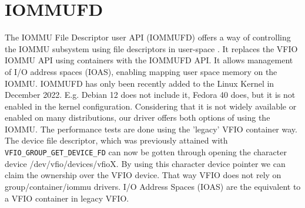 \section{IOMMUFD}
The IOMMU File Descriptor user API (IOMMUFD) offers a way of controlling the IOMMU subsystem using file descriptors in user-space \cite{iommufdkerneldocs}. It replaces the VFIO IOMMU API using containers with the IOMMUFD API.
It allows management of I/O address spaces (IOAS), enabling mapping user space memory on the IOMMU.
IOMMUFD has only been recently added to the Linux Kernel in December 2022. E.g. Debian 12 does not include it, Fedora 40 does, but it is not enabled in the kernel configuration. Considering that it is not widely available or enabled on many distributions, our driver offers both options of using the IOMMU. The performance tests are done using the 'legacy' VFIO container way.
The device file descriptor, which was previously attained with \texttt{VFIO\_GROUP\_GET\_DEVICE\_FD} can now be gotten through opening the character device /dev/vfio/devices/vfioX.
By using this character device pointer we can claim the ownership over the VFIO device. That way VFIO does not rely on group/container/iommu drivers.
I/O Address Spaces (IOAS) are the equivalent to a VFIO container in legacy VFIO.


